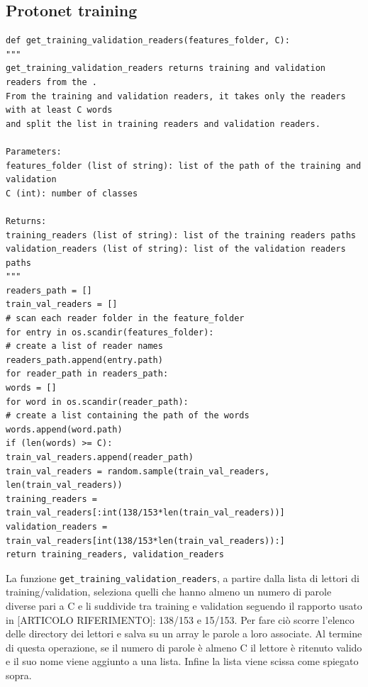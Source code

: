 \documentclass[12pt,a4paper,titlepage]{article}
\begin{document}
\subsection{Protonet training}
\begin{lstlisting}[language=iPython,firstnumber=1, caption=words\_per\_reader.py, label=words_per_reader,captionpos=b]
def get_training_validation_readers(features_folder, C):
"""
get_training_validation_readers returns training and validation readers from the . 
From the training and validation readers, it takes only the readers with at least C words
and split the list in training readers and validation readers.

Parameters:
features_folder (list of string): list of the path of the training and validation
C (int): number of classes

Returns:
training_readers (list of string): list of the training readers paths
validation_readers (list of string): list of the validation readers paths
"""
readers_path = []
train_val_readers = []
# scan each reader folder in the feature_folder
for entry in os.scandir(features_folder):
# create a list of reader names
readers_path.append(entry.path)
for reader_path in readers_path:
words = []
for word in os.scandir(reader_path):
# create a list containing the path of the words
words.append(word.path)
if (len(words) >= C):
train_val_readers.append(reader_path)
train_val_readers = random.sample(train_val_readers, len(train_val_readers))
training_readers = train_val_readers[:int(138/153*len(train_val_readers))]
validation_readers = train_val_readers[int(138/153*len(train_val_readers)):]
return training_readers, validation_readers
\end{lstlisting}
La funzione \texttt{get\_training\_validation\_readers}, a partire dalla lista di lettori di training/validation, seleziona quelli che hanno almeno un numero di parole diverse pari a C e li suddivide tra training e validation seguendo il rapporto usato in [ARTICOLO RIFERIMENTO]: 138/153 e 15/153.
Per fare ciò scorre l'elenco delle directory dei lettori e salva su un array le parole a loro associate. Al termine di questa operazione, se il numero di parole è almeno C il lettore è ritenuto valido e il suo nome viene aggiunto a una lista. Infine la lista viene scissa come spiegato sopra.
\end{document}
